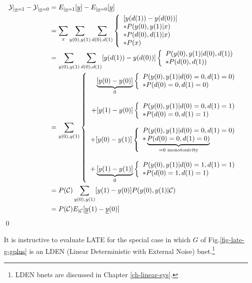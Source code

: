 \begin{align}
{\cal Y}_{|{\underline{a}}=1}-
{\cal Y}_{|{\underline{a}}=0}
&=
E_{|{\underline{a}}=1}[{\underline{y}}]
-
E_{|{\underline{a}}=0}[{\underline{y}}]
\\
&=
\sum_x
\sum_{y(0), y(1)}
\sum_{d(0), d(1)}
\left\{
\begin{array}{l}
[y(d(1))-y(d(0))]
\\
*P(y(0), y(1)|x)
\\
*P(d(0), d(1)|x)
\\
*P(x)
\end{array}
\right.
\\
&=
\sum_{y(0), y(1)}
\sum_{d(0), d(1)}
[y(d(1))-y(d(0))]
\left\{
\begin{array}{l}
P(y(0), y(1)|d(0), d(1))
\\
*P(d(0), d(1))
\end{array}
\right.
\\
&=
\sum_{y(0), y(1)}
\left\{
\begin{array}{r}
\underbrace{[y(0)-y(0)]}_{0}
\left\{
\begin{array}{l}
P(y(0), y(1)|d(0)=0, d(1)=0)
\\
*P(d(0)=0, d(1)=0)
\end{array}
\right.
\\
\\
+
[y(1)-y(0)]
\left\{
\begin{array}{l}
P(y(0), y(1)|d(0)=0, d(1)=1)
\\
*P(d(0)=0, d(1)=1)
\end{array}
\right.
\\
\\
+
[y(0)-y(1)]
\left\{
\begin{array}{l}
P(y(0), y(1)|d(0)=0, d(1)=0)
\\
*\underbrace{P(d(0)=0, d(1)=0)}
_{=0 \text{  monotonicity}}
\end{array}
\right.
\\
\\
+
\underbrace{[y(1)-y(1)]}_{0}
\left\{
\begin{array}{l}
P(y(0), y(1)|d(0)=1, d(1)=1)
\\
*P(d(0)=1, d(1)=1)
\end{array}
\right.
\end{array}
\right.
\\
&=
P({\cal C})
\sum_{y(0), y(1)}
[y(1)-y(0)]
P(y(0), y(1)|{\cal C})
\\
&=
P({\cal C})
E_{|{\cal C}}[{\underline{y}}(1)-{\underline{y}}(0)]
\end{align}
\qed

It
is instructive
to evaluate 
LATE for
the special case 
in which $G$
of
Fig.\ref{fig-late-g-gplus}
is an LDEN (Linear
Deterministic
with External
 Noise) bnet.\footnote{LDEN bnets are discussed in Chapter
 \ref{ch-linear-sys}.}
 
